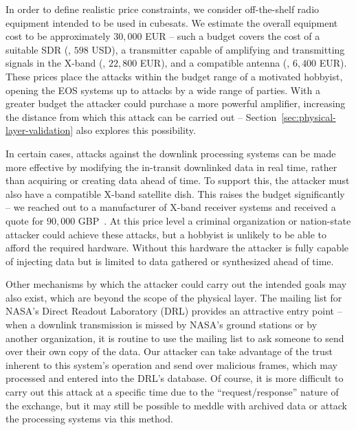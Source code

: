 In order to define realistic price constraints, we consider off-the-shelf radio equipment intended to be used in cubesats.
We estimate the overall equipment cost to be approximately $30,000$ EUR -- such a budget covers the cost of a suitable SDR (\cite{limeSdr,limeCompanion}, $598$ USD), a transmitter capable of amplifying and transmitting signals in the X-band (\cite{endurosat:xbandtransmitter}, $22,800$ EUR), and a compatible antenna (\cite{endurosat:xbandantenna}, $6,400$ EUR).
These prices place the attacks within the budget range of a motivated hobbyist, opening the EOS systems up to attacks by a wide range of parties.
With a greater budget the attacker could purchase a more powerful amplifier, increasing the distance from which this attack can be carried out -- Section~\ref{sec:physical-layer-validation} also explores this possibility.

In certain cases, attacks against the downlink processing systems can be made more effective by modifying the in-transit downlinked data in real time, rather than acquiring or creating data ahead of time.
To support this, the attacker must also have a compatible X-band satellite dish.
This raises the budget significantly -- we reached out to a manufacturer of X-band receiver systems and received a quote for $90,000$ GBP~\cite{dartcomsystemsltdXBandOverview2021}.
At this price level a criminal organization or nation-state attacker could achieve these attacks, but a hobbyist is unlikely to be able to afford the required hardware.
Without this hardware the attacker is fully capable of injecting data but is limited to data gathered or synthesized ahead of time.

Other mechanisms by which the attacker could carry out the intended goals may also exist, which are beyond the scope of the physical layer.
The mailing list for NASA's Direct Readout Laboratory (DRL) provides an attractive entry point -- when a downlink transmission is missed by NASA's ground stations or by another organization, it is routine to use the mailing list to ask someone to send over their own copy of the data.
Our attacker can take advantage of the trust inherent to this system's operation and send over malicious frames, which may processed and entered into the DRL's database.
Of course, it is more difficult to carry out this attack at a specific time due to the ``request/response'' nature of the exchange, but it may still be possible to meddle with archived data or attack the processing systems via this method.
